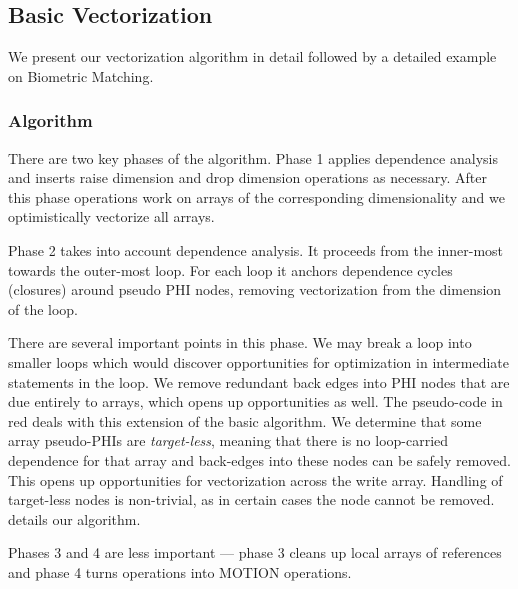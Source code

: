 \subsection{Basic Vectorization}

We present our vectorization algorithm in detail followed by a detailed example on Biometric Matching. 

\subsubsection{Algorithm}

There are two key phases of the algorithm. Phase 1 applies dependence analysis and inserts
raise dimension and drop dimension operations as necessary. After this phase operations work
on arrays of the corresponding dimensionality and we optimistically vectorize all arrays.

Phase 2 takes into account dependence analysis. It proceeds from the inner-most towards the outer-most 
loop. For each loop it anchors dependence cycles (closures) around pseudo PHI nodes, removing vectorization 
from the dimension of the loop.

There are several important points in this phase. We may break a loop into smaller loops which would discover opportunities 
for optimization in intermediate statements in the loop. We remove redundant back edges into PHI nodes that are 
due entirely to arrays, which opens up opportunities as well. The pseudo-code in red deals with this extension
of the basic algorithm. We determine that some array pseudo-PHIs are \emph{target-less}, meaning
that there is no loop-carried dependence for that array and back-edges into these nodes can be safely removed. 
This opens up opportunities for vectorization across the write array. Handling of target-less nodes is non-trivial, 
as in certain cases the node cannot be removed.  details our algorithm. 


Phases 3 and 4 are less important --- phase 3 cleans up local arrays of references and phase 4 turns operations into MOTION operations.

